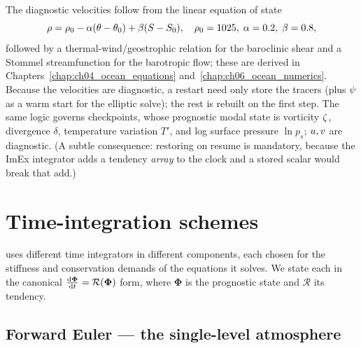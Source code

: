 The diagnostic velocities follow from the linear equation of state
\begin{equation}
  \rho = \rho_0 - \alpha(\theta-\theta_0) + \beta(S-S_0),
  \quad \rho_0=1025,\;\alpha=0.2,\;\beta=0.8,
  \label{eq:eos}
\end{equation}
followed by a thermal-wind/geostrophic relation for the baroclinic shear and a Stommel
streamfunction for the barotropic flow; these are derived in
Chapters~\ref{chap:ch04_ocean_equations} and~\ref{chap:ch06_ocean_numerics}. Because the
velocities are diagnostic, a restart need only store the tracers (plus $\psi$ as a warm start for
the elliptic solve); the rest is rebuilt on the first step. The same logic governs \dino{}
checkpoints, whose prognostic modal state is vorticity $\zeta$, divergence $\delta$, temperature
variation $T'$, and log surface pressure $\ln p_s$; $u,v$ are diagnostic. (A subtle
consequence: restoring  on resume is mandatory, because the ImEx integrator
adds a tendency \emph{array} to the clock and a stored scalar would break that add.)


\section{Time-integration schemes}\label{sec:time}

\model{} uses different time integrators in different components, each chosen for the stiffness
and conservation demands of the equations it solves. We state each in the canonical
$\frac{\mathrm{d}\boldsymbol\Phi}{\mathrm{d}t}=\mathcal{R}(\boldsymbol\Phi)$ form, where $\boldsymbol\Phi$ is the
prognostic state and $\mathcal{R}$ its tendency.

\subsection{Forward Euler --- the single-level atmosphere}

